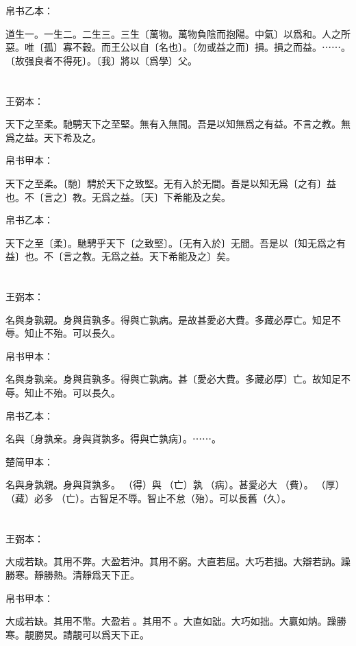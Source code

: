 \documentclass[a5paper]{ctexbook}
\begin{document}
    帛书乙本：

    道生一。一生二。二生三。三生〔萬物。萬物負陰而抱陽。中氣〕以爲和。人之所惡。唯〔孤〕寡不穀。而王公以自〔名也〕。〔勿或益之而〕損。損之而益。⋯⋯。〔故强良者不得死〕。〔我〕將以〔爲學〕父。

    \chapter{}
    王弼本：

    天下之至柔。馳騁天下之至堅。無有入無間。吾是以知無爲之有益。不言之教。無爲之益。天下希及之。

    
    帛书甲本：

    天下之至柔。〔馳〕騁於天下之致堅。无有入於无間。吾是以知无爲〔之有〕益也。不〔言之〕教。无爲之益。〔天〕下希能及之矣。

    帛书乙本：

    天下之至〔柔〕。馳騁乎天下〔之致堅〕。〔无有入於〕无間。吾是以〔知无爲之有益〕也。不〔言之教。无爲之益。天下希能及之〕矣。

    \chapter{}
    王弼本：

    名與身孰親。身與貨孰多。得與亡孰病。是故甚愛必大費。多藏必厚亡。知足不辱。知止不殆。可以長久。

    
    帛书甲本：

    名與身孰亲。身與貨孰多。得與亡孰病。甚〔愛必大費。多藏必厚〕亡。故知足不辱。知止不殆。可以長久。

    帛书乙本：

    名與〔身孰亲。身與貨孰多。得與亡孰病〕。⋯⋯。

    楚简甲本：

    名與身孰親。身與貨孰多。󰴼（得）與󶵔（亡）孰󶓄（病）。甚愛必大󶵖（費）。󶵗（厚）󶤖（藏）必多󶵔（亡）。古智足不辱。智止不怠（殆）。可以長舊（久）。

    \chapter{}
    王弼本：

    大成若缺。其用不弊。大盈若沖。其用不窮。大直若屈。大巧若拙。大辯若訥。躁勝寒。靜勝熱。清靜爲天下正。

    
    帛书甲本：

    大成若缺。其用不幣。大盈若𥁵。其用不𡩫。大直如詘。大巧如拙。大贏如㶧。躁勝寒。靚勝炅。請靚可以爲天下正。
\end{document}
